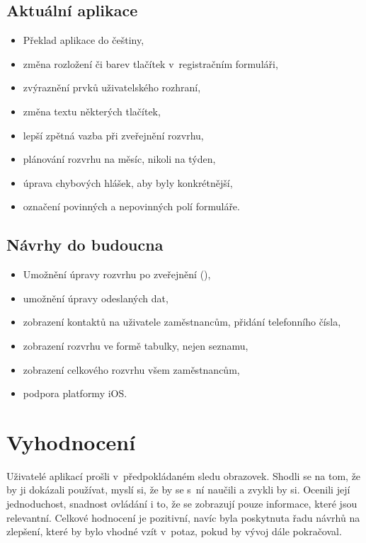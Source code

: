 \documentclass[a4paper,11pt,openany,twoside]{book}
\begin{document}
\subsection{Aktuální aplikace}
\begin{itemize}
	\item Překlad aplikace do češtiny,
	\item změna rozložení či barev tlačítek v~registračním formuláři,
	\item zvýraznění prvků uživatelského rozhraní,
	\item změna textu některých tlačítek,
	\item lepší zpětná vazba při zveřejnění rozvrhu,
	\item plánování rozvrhu na měsíc, nikoli na týden,
	\item úprava chybových hlášek, aby byly konkrétnější,
	\item označení povinných a nepovinných polí formuláře.
\end{itemize}

\subsection{Návrhy do budoucna}
\begin{itemize}
	\item Umožnění úpravy rozvrhu po zveřejnění (\textit{}),
	\item umožnění úpravy odeslaných dat,
	\item zobrazení kontaktů na uživatele zaměstnancům, přidání telefonního čísla,
	\item zobrazení rozvrhu ve formě tabulky, nejen seznamu,
	\item zobrazení celkového rozvrhu všem zaměstnancům,
	\item podpora platformy iOS.
\end{itemize}


\section{Vyhodnocení}
Uživatelé aplikací prošli v~předpokládaném sledu obrazovek. Shodli se na tom, že by ji dokázali používat, myslí si, že by se s~ní naučili a zvykli by si. Ocenili její jednoduchost, snadnost ovládání i to, že se zobrazují pouze informace, které jsou relevantní. Celkové hodnocení je pozitivní, navíc byla poskytnuta řadu návrhů na zlepšení, které by bylo vhodné vzít v~potaz, pokud by vývoj dále pokračoval.
\end{document}
